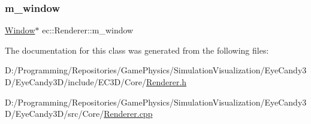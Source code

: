 \mbox{\label{classec_1_1_renderer_ac23d74f9d295bf833f095bdff8c8169b}} 
\subsubsection{\texorpdfstring{m\+\_\+window}{m\_window}}
{\footnotesize\ttfamily \mbox{\hyperlink{classec_1_1_window}{Window}}$\ast$ ec\+::\+Renderer\+::m\+\_\+window\hspace{0.3cm}{\ttfamily [protected]}}



The documentation for this class was generated from the following files\+:\begin{DoxyCompactItemize}
\item 
D\+:/\+Programming/\+Repositories/\+Game\+Physics/\+Simulation\+Visualization/\+Eye\+Candy3\+D/\+Eye\+Candy3\+D/include/\+E\+C3\+D/\+Core/\mbox{\hyperlink{_renderer_8h}{Renderer.\+h}}\item 
D\+:/\+Programming/\+Repositories/\+Game\+Physics/\+Simulation\+Visualization/\+Eye\+Candy3\+D/\+Eye\+Candy3\+D/src/\+Core/\mbox{\hyperlink{_renderer_8cpp}{Renderer.\+cpp}}\end{DoxyCompactItemize}
